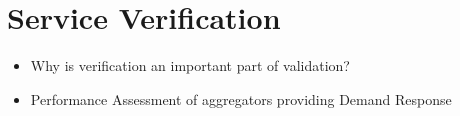 \chapter{Service Verification} %
\label{cha:verification}

\begin{itemize}
	\item Why is verification an important part of validation?
	\item Performance Assessment of aggregators providing Demand Response
\end{itemize}

